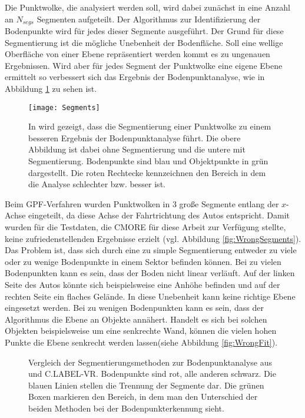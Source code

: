Die Punktwolke, die analysiert werden soll, wird dabei zunächst in eine Anzahl an $N_{segs}$ Segmenten aufgeteilt. Der Algorithmus zur Identifizierung der Bodenpunkte wird für jedes dieser Segmente ausgeführt. Der Grund für diese Segmentierung ist die mögliche Unebenheit der Bodenfläche. Soll eine wellige Oberfläche von einer Ebene repräsentiert werden kommt es zu ungenauen Ergebnissen. Wird aber für jedes Segment der Punktwolke eine eigene Ebene ermittelt so verbessert sich das Ergebnis der Bodenpunktanalyse, wie in Abbildung \ref{fig:Segments} zu sehen ist.

\begin{figure}%
	\centering
    \texttt{[image: Segments]}
    \caption{In \cite{bib:Segmentation1} wird gezeigt, dass die Segmentierung einer Punktwolke zu einem besseren Ergebnis der Bodenpunktanalyse führt. Die obere Abbildung ist dabei ohne Segmentierung und die untere mit Segmentierung. Bodenpunkte sind blau und Objektpunkte in grün dargestellt. Die roten Rechtecke kennzeichnen den Bereich in dem die Analyse schlechter bzw. besser ist.}
    \label{fig:Segments}
\end{figure}

Beim GPF-Verfahren wurden Punktwolken in 3 große Segmente entlang der $x$-Achse eingeteilt, da diese Achse der Fahrtrichtung des Autos entspricht. Damit wurden für die Testdaten, die CMORE für diese Arbeit zur Verfügung stellte, keine zufriedenstellenden Ergebnisse erzielt (vgl. Abbildung \ref{fig:WrongSegments}). Das Problem ist, dass sich durch eine zu simple Segmentierung entweder zu viele oder zu wenige Bodenpunkte in einem Sektor befinden können. Bei zu vielen Bodenpunkten kann es sein, dass der Boden nicht linear verläuft. Auf der linken Seite des Autos könnte sich beispielsweise eine Anhöhe befinden und auf der rechten Seite ein flaches Gelände. In diese Unebenheit kann keine richtige Ebene eingesetzt werden. Bei zu wenigen Bodenpunkten kann es sein, dass der Algorithmus die Ebene an Objekte annähert. Handelt es sich bei solchen Objekten beispielsweise um eine senkrechte Wand, können die vielen hohen Punkte die Ebene senkrecht werden lassen(siehe Abbildung \ref{fig:WrongFit}).\\

\begin{figure}%
    \centering
    \qquad
    \caption{Vergleich der Segmentierungsmethoden zur Bodenpunktanalyse aus \cite{bib:Segmentation1} und C.LABEL-VR. Bodenpunkte sind rot, alle anderen schwarz. Die blauen Linien stellen die Trennung der Segmente dar. Die grünen Boxen markieren den Bereich, in dem man den Unterschied der beiden Methoden bei der Bodenpunkterkennung sieht.}\label{fig:Segmentation}%
\end{figure}

